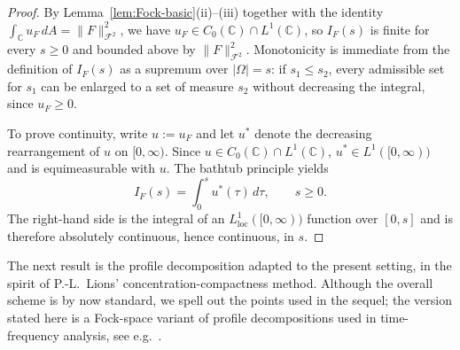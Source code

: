\documentclass[a4paper,11pt,reqno]{amsart}
\numberwithin{equation}{section}
\theoremstyle{plain} %
\theoremstyle{definition} %
\theoremstyle{remark}
\newcommand{\C}{\mathbb{C}}
\begin{document}
\begin{proof}
By Lemma~\ref{lem:Fock-basic}(ii)--(iii) together with the identity
\(\int_\C u_F\,dA=\|F\|_{\mathcal F^2}^2\), we have
\(u_F\in C_0(\C)\cap L^1(\C)\), so \(I_F(s)\) is finite for every \(s\ge 0\)
and bounded above by \(\|F\|_{\mathcal F^2}^2\). Monotonicity is immediate
from the definition of \(I_F(s)\) as a supremum over \(|\Omega|=s\): if
\(s_1\le s_2\), every admissible set for \(s_1\) can be enlarged to a set of
measure \(s_2\) without decreasing the integral, since \(u_F\ge 0\).

To prove continuity, write \(u:=u_F\) and let \(u^*\) denote the decreasing
rearrangement of \(u\) on \([0,\infty)\). Since \(u\in C_0(\C)\cap L^1(\C)\),
\(u^*\in L^1([0,\infty))\) and is equimeasurable with \(u\). The bathtub
principle yields
\[
I_F(s)=\int_0^s u^*(\tau)\,d\tau,\qquad s\ge 0.
\]
The right-hand side is the integral of an
\(L^1_{\mathrm{loc}}([0,\infty))\) function over \([0,s]\) and is therefore
absolutely continuous, hence continuous, in \(s\).
\end{proof}

The next result is the profile decomposition adapted to the present setting,
in the spirit of P.-L.~Lions' concentration-compactness method. Although the
overall scheme is by now standard, we spell out the points used in the
sequel; the version stated here is a Fock-space variant of profile
decompositions used in time-frequency analysis, see e.g.\
\cite{Nicola-Romero-Trapasso, Marceca-Romero-Speckbacher, Fulsche-Hagger,
Samuelsen}.
\end{document}
